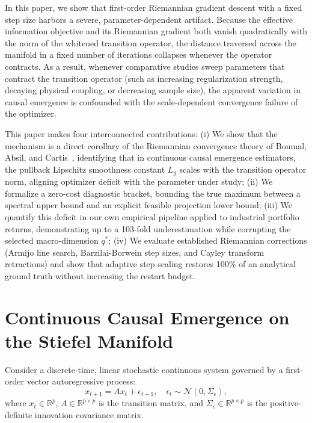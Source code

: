\documentclass[preprint,12pt]{elsarticle}
\begin{document}
In this paper, we show that first-order Riemannian gradient descent with a fixed step size harbors a severe, parameter-dependent artifact. Because the effective information objective and its Riemannian gradient both vanish quadratically with the norm of the whitened transition operator, the distance traversed across the manifold in a fixed number of iterations collapses whenever the operator contracts. As a result, whenever comparative studies sweep parameters that contract the transition operator (such as increasing regularization strength, decaying physical coupling, or decreasing sample size), the apparent variation in causal emergence is confounded with the scale-dependent convergence failure of the optimizer.

This paper makes four interconnected contributions:
(i) We show that the mechanism is a direct corollary of the Riemannian convergence theory of Boumal, Absil, and Cartis~\cite{Boumal2019,Boumal2019erratum}, identifying that in continuous causal emergence estimators, the pullback Lipschitz smoothness constant $L_g$ scales with the transition operator norm, aligning optimizer deficit with the parameter under study;
(ii) We formalize a zero-cost diagnostic bracket, bounding the true maximum between a spectral upper bound and an explicit feasible projection lower bound;
(iii) We quantify this deficit in our own empirical pipeline applied to industrial portfolio returns, demonstrating up to a 103-fold underestimation while corrupting the selected macro-dimension $q^*$;
(iv) We evaluate established Riemannian corrections (Armijo line search, Barzilai-Borwein step sizes, and Cayley transform retractions) and show that adaptive step scaling restores 100\% of an analytical ground truth without increasing the restart budget.

\section{Continuous Causal Emergence on the Stiefel Manifold}

Consider a discrete-time, linear stochastic continuous system governed by a first-order vector autoregressive process:
\begin{equation}
x_{t+1} = A x_t + \epsilon_{t+1}, \quad \epsilon_t \sim \mathcal{N}(0, \Sigma_\epsilon),
\label{eq:micro_var}
\end{equation}
where $x_t \in \mathbb{R}^p$, $A \in \mathbb{R}^{p \times p}$ is the transition matrix, and $\Sigma_\epsilon \in \mathbb{R}^{p \times p}$ is the positive-definite innovation covariance matrix. 
\end{document}
